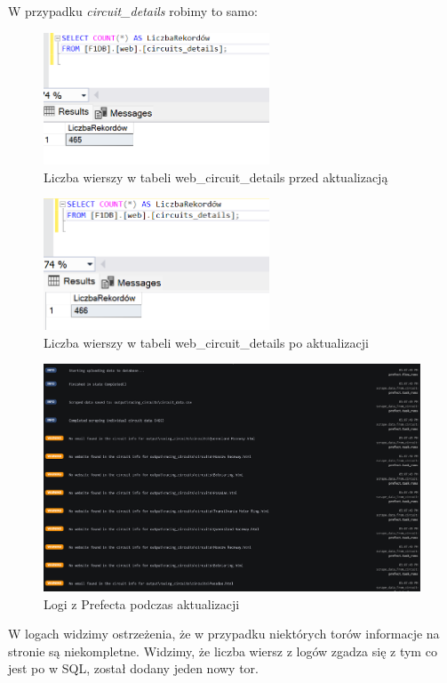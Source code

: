 \documentclass[12pt]{article}
\begin{document}
W przypadku \textit{circuit\_details} robimy to samo:

\begin{figure}[H]
    \centering   \includegraphics[width=0.6\textwidth]{test9.png}
    \caption{Liczba wierszy w tabeli web\_circuit\_details przed aktualizacją}
\end{figure}


\begin{figure}[H]
    \centering   \includegraphics[width=0.6\textwidth]{test11.png}
    \caption{Liczba wierszy w tabeli web\_circuit\_details po aktualizacji}
\end{figure}

\begin{figure}[H]
    \centering   \includegraphics[width=\textwidth]{test10.png}
    \caption{Logi z Prefecta podczas aktualizacji}
\end{figure}
W logach widzimy ostrzeżenia, że w przypadku niektórych torów informacje na stronie są niekompletne. Widzimy, że liczba wiersz z logów zgadza się z tym co jest po w SQL, został dodany jeden nowy tor.
\end{document}
